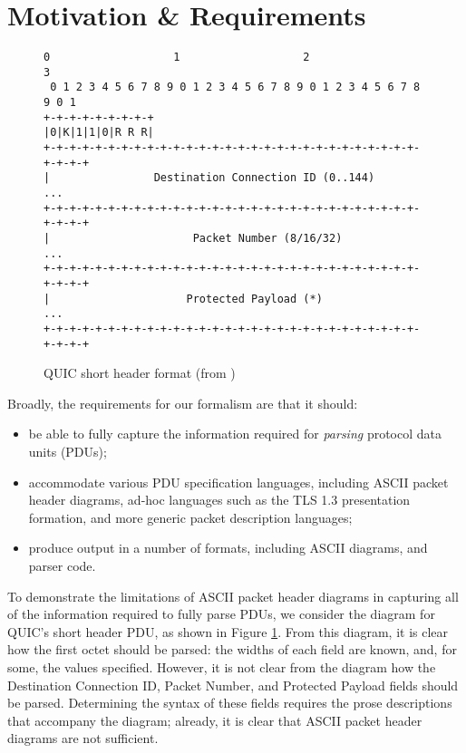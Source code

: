 \documentclass[10pt,sigconf]{acmart}
\begin{document}
\section{Motivation \& Requirements}
\label{sec:motivation}

\begin{figure}
	\centering
	\vspace{3mm}
    \begin{BVerbatim}[fontsize=\scriptsize]
 0                   1                   2                   3
 0 1 2 3 4 5 6 7 8 9 0 1 2 3 4 5 6 7 8 9 0 1 2 3 4 5 6 7 8 9 0 1
+-+-+-+-+-+-+-+-+
|0|K|1|1|0|R R R|
+-+-+-+-+-+-+-+-+-+-+-+-+-+-+-+-+-+-+-+-+-+-+-+-+-+-+-+-+-+-+-+-+
|                Destination Connection ID (0..144)           ...
+-+-+-+-+-+-+-+-+-+-+-+-+-+-+-+-+-+-+-+-+-+-+-+-+-+-+-+-+-+-+-+-+
|                      Packet Number (8/16/32)                ...
+-+-+-+-+-+-+-+-+-+-+-+-+-+-+-+-+-+-+-+-+-+-+-+-+-+-+-+-+-+-+-+-+
|                     Protected Payload (*)                   ...
+-+-+-+-+-+-+-+-+-+-+-+-+-+-+-+-+-+-+-+-+-+-+-+-+-+-+-+-+-+-+-+-+
    \end{BVerbatim}
    \caption{QUIC short header format (from \cite{draft-ietf-quic-transport-latest})}
    \label{fig:quic-short-hdr}
\end{figure}

Broadly, the requirements for our formalism are that it should:
\begin{itemize}
	\item be able to fully capture the information required for \emph{parsing} protocol
		  data units (PDUs);
	\item accommodate various PDU specification languages, including ASCII
		  packet header diagrams, ad-hoc languages
		  such as the TLS 1.3 presentation formation, and more generic packet description
		  languages;
	\item produce output in a number of formats, including ASCII diagrams, and parser
		  code.
\end{itemize}

To demonstrate the limitations of ASCII packet header diagrams in capturing all of the
information required to fully parse PDUs, we consider the diagram for QUIC's short header
PDU, as shown in Figure \ref{fig:quic-short-hdr}. From this diagram, it is clear how the
first octet should be parsed: the widths of each field are known, and, for some, the
values specified. However, it is not clear from the diagram how the Destination Connection
ID, Packet Number, and Protected Payload fields should be parsed. Determining the syntax
of these fields requires the prose descriptions that accompany the diagram; already, it is
clear that ASCII packet header diagrams are not sufficient.
\end{document}
